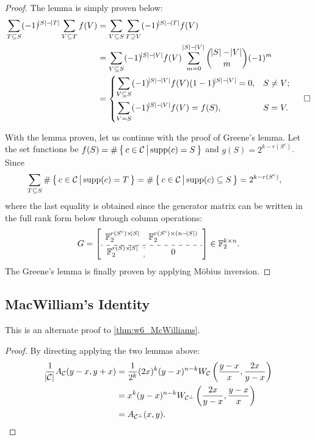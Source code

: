 \begin{proof}
        The lemma is simply proven below:
        \begin{align*}
            \sum_{T\subseteq S} (-1)^{\abs{S}-\abs{T}} \sum_{V\subseteq T} f(V) &= \sum_{V\subseteq S} \sum_{T\supseteq V} (-1)^{\abs{S}-\abs{T}} f(V) \\
            &= \sum_{V\subseteq S} (-1)^{\abs{S}-\abs{V}} f(V) \sum_{m=0}^{\abs{S}-\abs{V}} \binom{\abs{S}-\abs{V}}{m} (-1)^m \\
            &= \begin{dcases}
                \sum_{V\subseteq S} (-1)^{\abs{S}-\abs{V}} f(V) (1-1)^{\abs{S}-\abs{V}} = 0, &S\neq V;\\
                \sum_{V = S} (-1)^{\abs{S}-\abs{V}} f(V) = f(S), &S=V.
            \end{dcases}\;\;\;\;\;\square
        \end{align*}
        
    With the lemma proven, let us continue with the proof of Greene's lemma. Let the set functions be $f(S) = \#\left\{\,{c\in\mathcal{C}}\,\middle\vert\,{\mathrm{supp}(c)=S}\,\right\}$ and $g(S) = 2^{k-r(S^\mathrm{c})}$. Since
    \begin{align*}
        \sum_{T\subseteq S} \#\left\{\,{c\in\mathcal{C}}\,\middle\vert\,{\mathrm{supp}(c)=T}\,\right\} &= \#\left\{\,{c\in\mathcal{C}}\,\middle\vert\,{\mathrm{supp}(c)\subseteq S}\,\right\} = 2^{k-r(S^\mathrm{c})},
    \end{align*}
    where the last equality is obtained since the generator matrix can be written in the full rank form below through column operations:
    \begin{equation*}
        G = \left[\begin{array}{c:c}
            \mathbb{F}_2^{r(S^\mathrm{c})\times\abs{S}} & \mathbb{F}_2^{r(S^\mathrm{c})\times(n-\abs{S})} \vspace{0.1cm} \\ \hdashline 
            \mathbb{F}_2^{r(S)\times\abs{S}} & 0
        \end{array}\right] \in\mathbb{F}_2^{k\times n}.
    \end{equation*}
    The Greene's lemma is finally proven by applying M\"obius inversion.
\end{proof}

\subsection{MacWilliam's Identity}  \label{app:MacWilliams}
This is an alternate proof to \autoref{thm:w6_McWilliams}.
\begin{proof}
    By directing applying the two lemmas above:
    \begin{align*}
        \frac{1}{\abs{\mathcal{C}}}A_{\mathcal{C}}(y-x,y+x) &= \frac{1}{2^k} (2x)^k(y-x)^{n-k} W_\mathcal{C}\left(\frac{y-x}{x},\frac{2x}{y-x}\right) \\
        &= x^k (y-x)^{n-k} W_{\mathcal{C}^\perp}\left(\frac{2x}{y-x},\frac{y-x}{x}\right) \\
        &= A_{\mathcal{C}^\perp}(x,y).
    \end{align*}
\end{proof}

